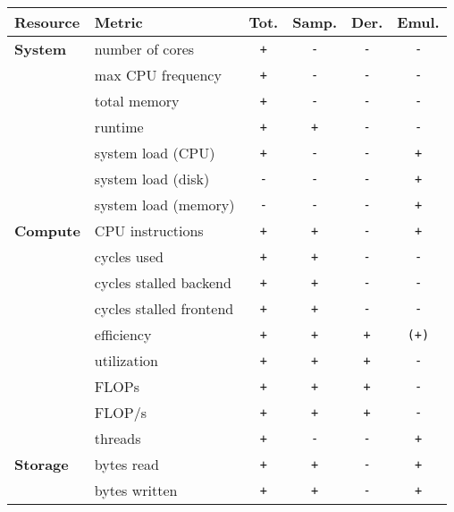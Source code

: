 \documentclass[10pt, conference, compsocconf]{IEEEtran}
\newcommand{\B}[1]{\textbf{#1}\xspace}
\newcommand{\T}[1]{\texttt{#1}\xspace}
\begin{document}
 \begin{table}[t]
  \begin{center}
   \begin{tabular}{llcccc}
    \toprule
    \B{Resource} & \B{Metric}              & \B{Tot.} & \B{Samp.} & \B{Der.} & \B{Emul.}\\\midrule
    \B{System }  & number of cores         &  \T{ + } &   \T{ - } &  \T{ - } &  \T{ - } \\
                 & max CPU frequency       &  \T{ + } &   \T{ - } &  \T{ - } &  \T{ - } \\
                 & total memory            &  \T{ + } &   \T{ - } &  \T{ - } &  \T{ - } \\
                 & runtime                 &  \T{ + } &   \T{ + } &  \T{ - } &  \T{ - } \\
                 & system load (CPU)       &  \T{ + } &   \T{ - } &  \T{ - } &  \T{ + } \\
                 & system load (disk)      &  \T{ - } &   \T{ - } &  \T{ - } &  \T{ + } \\
                 & system load (memory)    &  \T{ - } &   \T{ - } &  \T{ - } &  \T{ + } \\\midrule
    \B{Compute}  & CPU instructions        &  \T{ + } &   \T{ + } &  \T{ - } &  \T{ + } \\
                 & cycles used             &  \T{ + } &   \T{ + } &  \T{ - } &  \T{ - } \\
                 & cycles stalled backend  &  \T{ + } &   \T{ + } &  \T{ - } &  \T{ - } \\
                 & cycles stalled frontend &  \T{ + } &   \T{ + } &  \T{ - } &  \T{ - } \\
                 & efficiency              &  \T{ + } &   \T{ + } &  \T{ + } &  \T{(+)} \\
                 & utilization             &  \T{ + } &   \T{ + } &  \T{ + } &  \T{ - } \\
                 & FLOPs                   &  \T{ + } &   \T{ + } &  \T{ + } &  \T{ - } \\
                 & FLOP/s                  &  \T{ + } &   \T{ + } &  \T{ + } &  \T{ - } \\
                 & threads                 &  \T{ + } &   \T{ - } &  \T{ - } &  \T{ + } \\\midrule
    \B{Storage}  & bytes read              &  \T{ + } &   \T{ + } &  \T{ - } &  \T{ + } \\
                 & bytes written           &  \T{ + } &   \T{ + } &  \T{ - } &  \T{ + } \\

\end{tabular}
\end{center}
\end{table}
\end{document}
